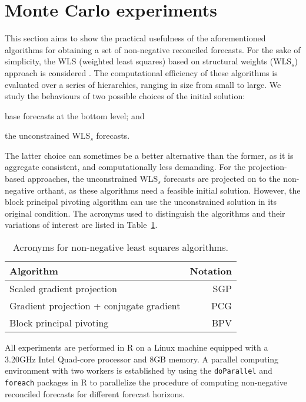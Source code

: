 \documentclass[11pt]{article}
\newcommand{\0}{\phantom{0}}
\begin{document}
\section{Monte Carlo experiments}
\label{sec:MCNN}

This section aims to show the practical usefulness of the aforementioned algorithms for obtaining a set of non-negative reconciled forecasts. For the sake of simplicity, the WLS (weighted least squares) based on structural weights (WLS$_{s}$) approach is considered \citep{Wick2018}. The computational efficiency of these algorithms is evaluated over a series of hierarchies, ranging in size from small to large. We study the behaviours of two possible choices of the initial solution: \begin{inparaenum}[(i)] \item base forecasts at the bottom level; and \item the unconstrained WLS$_{s}$ forecasts. \end{inparaenum} The latter choice can sometimes be a better alternative than the former, as it is aggregate consistent, and computationally less demanding. For the projection-based approaches, the unconstrained WLS$_{s}$ forecasts are projected on to the non-negative orthant, as these algorithms need a feasible initial solution. However, the block principal pivoting algorithm can use the unconstrained solution in its original condition. The acronyms used to distinguish the algorithms and their variations of interest are listed in Table~\ref{tbl:acronn}.

\begin{table}[ht]
	\centering

	\caption{Acronyms for non-negative least squares algorithms.}
	\label{tbl:acronn}
		\begin{tabular}{lr}
			\toprule
			Algorithm & Notation \\
			\midrule
			Scaled gradient projection & SGP\\[0.1cm]
			Gradient projection + conjugate gradient & PCG \\[0.1cm]
			Block principal pivoting & BPV \\
			\bottomrule
		\end{tabular}
\end{table}

All experiments are performed in R on a Linux machine equipped with a 3.20GHz Intel Quad-core processor and 8GB memory. A parallel computing environment with two workers is established by using the \texttt{doParallel} \citep{doparallel2015} and \texttt{foreach} \citep{foreach2015} packages in R to parallelize the procedure of computing non-negative reconciled forecasts for different forecast horizons.
\end{document}
